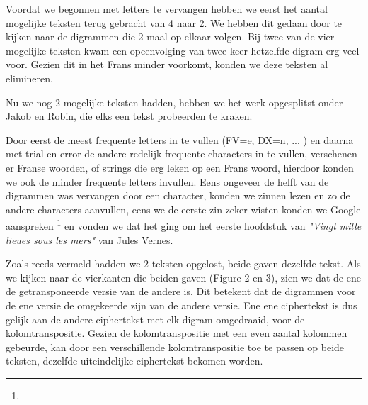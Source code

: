 Voordat we begonnen met letters te vervangen hebben we eerst het aantal mogelijke teksten terug gebracht van 4 naar 2. We hebben dit gedaan door te kijken naar de digrammen die 2 maal op elkaar volgen. Bij twee van de vier mogelijke teksten kwam een opeenvolging van twee keer hetzelfde digram erg veel voor. Gezien dit in het Frans minder voorkomt, konden we deze teksten al elimineren.

Nu we nog 2 mogelijke teksten hadden, hebben we het werk opgesplitst onder Jakob en Robin, die elks een tekst probeerden te kraken.

Door eerst de meest frequente letters in te vullen (FV=e, DX=n, ... ) en daarna met trial en error de andere redelijk frequente characters in te vullen, verschenen er Franse woorden, of strings die erg leken op een Frans woord, hierdoor konden we ook de minder frequente letters invullen. Eens ongeveer de helft van de digrammen was vervangen door een character, konden we zinnen lezen en zo de andere characters aanvullen, eens we de eerste zin zeker wisten konden we Google aanspreken \footnote{\googleSearch} en vonden we dat het ging om het eerste hoofdstuk van \textit{"Vingt mille lieues sous les mers"} van Jules Vernes. 

Zoals reeds vermeld hadden we 2 teksten opgelost, beide gaven dezelfde tekst. Als we kijken naar de vierkanten die beiden gaven (Figure 2 en 3), zien we dat de ene de getransponeerde versie van de andere is. Dit betekent dat de digrammen voor de ene versie de omgekeerde zijn van de andere versie. Ene ene ciphertekst is dus gelijk aan de andere ciphertekst met elk digram omgedraaid, voor de kolomtranspositie. Gezien de kolomtranspositie met een even aantal kolommen gebeurde, kan door een verschillende kolomtranspositie toe te passen op beide teksten, dezelfde uiteindelijke ciphertekst bekomen worden.


